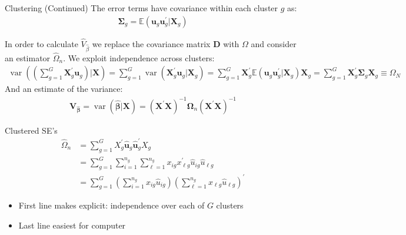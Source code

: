 \documentclass[aspectratio=169]{beamer}
\begin{document}
\begin{frame}{Clustering (Continued)}
The error terms have covariance within each cluster $g$ as:
\begin{align*}
 \boldsymbol{\Sigma}_ { g } = \mathbb { E } \left( \mathbf{u} _ { g }  \mathbf{ u } _ { g } ^ { \prime } | \boldsymbol { X } _ { g } \right)
\end{align*}

In order to calculate $\widehat{V}_{\widehat{\beta}}$ we replace the covariance matrix $\mathbf{D}$ with $\Omega$ and consider an estimator $\widehat{\Omega}_n$. We exploit \alert{independence across clusters}:
\begin{align*}
\operatorname { var } \left( \left( \sum _ { g = 1 } ^ { G } \boldsymbol { X } _ { g } ^ { \prime } \mathbf{u}_ { g } \right) | \boldsymbol { X } \right) = \sum _ { g = 1 } ^ { G } \operatorname { var } \left( \boldsymbol { X } _ { g } ^ { \prime } \boldsymbol { u } _ { g } | \boldsymbol { X } _ { g } \right)
= \sum _ { g = 1 } ^ { G } \boldsymbol { X } _ { g } ^ { \prime } \mathbb { E } \left( \boldsymbol { u } _ { g } \boldsymbol { u } _ { g } ^ { \prime } | \boldsymbol { X } _ { g } \right) \boldsymbol { X } _ { g }
= \sum _ { g = 1 } ^ { G } \boldsymbol { X } _ { g } ^ { \prime } \boldsymbol { \Sigma } _ { g } \mathbf { X } _ { g } 
 \equiv \Omega_N
\end{align*}
And an estimate of the variance:
\begin{align*}
\boldsymbol { V } _ { \widehat { \boldsymbol { \beta } } } = \operatorname { var } ( \widehat { \boldsymbol { \beta } } | \boldsymbol { X } )
= \left( \mathbf { X } ^ { \prime } \mathbf { X } \right) ^ { - 1 } \boldsymbol { \Omega } _ { n } \left( \mathbf { X } ^ { \prime } \mathbf { X } \right) ^ { - 1 }
\end{align*}
\end{frame}


\begin{frame}{Clustered SE's}
\begin{align*}
\widehat { \Omega } _ { n } &= \sum _ { g = 1 } ^ { G } X _ { g } ^ { \prime } \widehat {\mathbf{ u }} _ { g }\widehat {\mathbf{ u }}_{g} ^ { \prime } X _ { g }\\
&= \sum _ { g = 1 } ^ { G } \sum _ { i = 1 } ^ { n _ { g } } \sum _ { \ell = 1 } ^ { n _ { g } } x _ { i g } x _ { \ell g } ^ { \prime } \widehat { u } _ { i g } \widehat { u } _ { \ell g }\\
&= \sum _ { g = 1 } ^ { G } \left( \sum _ { i = 1 } ^ { n _ { g } } x _ { i g } \widehat { u } _ { i g } \right) \left( \sum _ { \ell = 1 } ^ { n _ { g } } x _ { \ell g } \widehat { u } _ { \ell g } \right) ^ { \prime }
\end{align*}
\begin{itemize}
\item First line makes explicit: independence over each of $G$ clusters
\item Last line easiest for computer
\end{itemize}
\end{frame}
\end{document}
